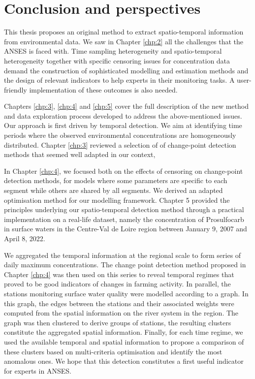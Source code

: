 

\chapter{Conclusion and perspectives}

This thesis proposes an original method to extract spatio-temporal information from environmental data. We saw in Chapter \ref{chp:2} all the challenges that the ANSES is faced with. Time sampling heterogeneity and spatio-temporal heterogeneity together with specific censoring issues for concentration data demand the construction of sophisticated modelling and estimation methods and the design of relevant indicators to help experts in their monitoring tasks. A user-friendly implementation of these outcomes is also needed.

Chapters \ref{chp:3}, \ref{chp:4} and \ref{chp:5} cover the full description of the new method and data exploration process developed to address the above-mentioned issues.  Our approach is first driven by temporal detection. We aim at identifying time periods where the observed environmental concentrations are homogeneously distributed. Chapter \ref{chp:3} reviewed a selection of of change-point detection methods that seemed well adapted in our context, 

In Chapter \ref{chp:4}, we focused both on the effects of censoring on change-point detection methods, for models where some parameters are specific to each segment while others are shared by all segments. We derived an adapted optimisation method for our modelling framework. Chapter 5 provided the principles underlying our spatio-temporal detection method through a practical implementation on a real-life dataset, namely the concentration of Prosulfocarb in surface waters in the Centre-Val de Loire region between January 9, 2007 and April 8, 2022.   

We aggregated the temporal information at the regional scale to form series of daily maximum concentrations. The change point detection method proposed in Chapter \ref{chp:4} was then used on this series to reveal temporal regimes that proved to be good indicators of changes in farming activity.  In parallel, the stations monitoring surface water quality were modelled according to a graph. In this graph, the edges between the stations and their associated weights were computed from the spatial information on the river system in the region. The graph was then clustered to derive groups of stations, the resulting clusters constitute the aggregated spatial information. Finally, for each time regime, we used the available temporal and spatial information to propose a comparison of these clusters based on multi-criteria optimisation and identify the most anomalous ones. We hope that this detection constitutes a first useful indicator for experts in ANSES. 

